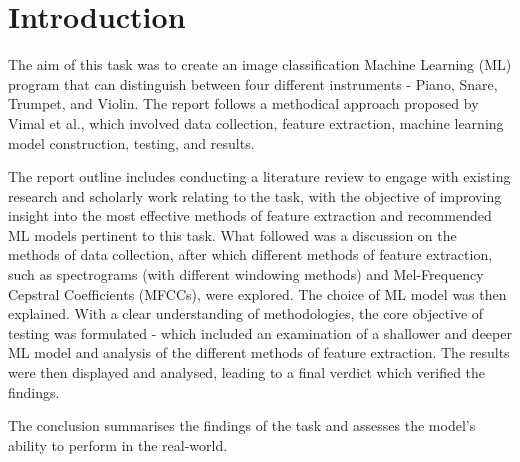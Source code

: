\section{Introduction}

The aim of this task was to create an image classification Machine Learning (ML) program that can distinguish between four different instruments - Piano, Snare, Trumpet, and Violin. The report follows a methodical approach proposed by Vimal et al., which involved data collection, feature extraction, machine learning model construction, testing, and results.

The report outline includes conducting a literature review to engage with existing research and scholarly work relating to the task, with the objective of improving insight into the most effective methods of feature extraction and recommended ML models pertinent to this task. What followed was a discussion on the methods of data collection, after which different methods of feature extraction, such as spectrograms (with different windowing methods) and Mel-Frequency Cepstral Coefficients (MFCCs), were explored. The choice of ML model was then explained. With a clear understanding of methodologies, the core objective of testing was formulated - which included an examination of a shallower and deeper ML model and analysis of the different methods of feature extraction. The results were then displayed and analysed, leading to a final verdict which verified the findings. 

The conclusion summarises the findings of the task and assesses the model's ability to perform in the real-world.